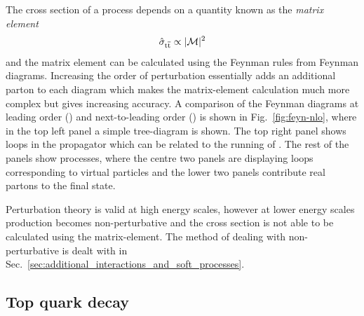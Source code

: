 The cross section of a process depends on a quantity known as the \textit{matrix element}
\begin{equation*}
	\hat{\sigma}_{\mathrm{t}\overline{\mathrm{t}}{}}\propto\lvert \mathcal{M} \rvert^2
\end{equation*}
and the matrix element can be calculated using the Feynman rules from Feynman diagrams.
Increasing the order of perturbation essentially adds an additional parton to each diagram which makes the matrix-element calculation much more complex but gives increasing accuracy.
A comparison of the Feynman diagrams at leading order (\LO{}) and next-to-leading order (\NLO{}) is shown in Fig.~\ref{fig:feyn-nlo}, where in the top left panel a simple \LO{} tree-diagram is shown. 
The top right panel shows loops in the propagator which can be related to the running of \alpS{}.
The rest of the panels show \NLO{} processes, where the centre two panels are displaying loops corresponding to virtual particles 
and the lower two panels contribute real partons to the final state.


Perturbation theory is valid at high energy scales, however at lower energy scales \QCD{} production becomes non-perturbative and the cross section is not able to be calculated using the matrix-element.
The method of dealing with non-perturbative \QCD{} is dealt with in Sec.~\ref{sec:additional_interactions_and_soft_processes}.




\subsection{Top quark decay} %
\label{sub:top_quark_decay}

